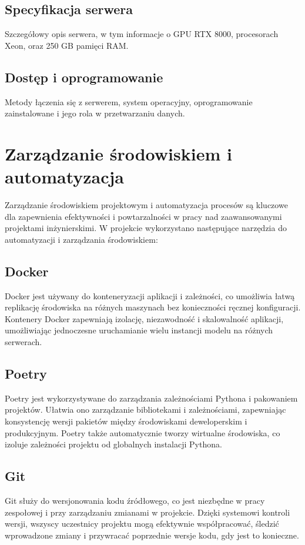\documentclass[12pt,twoside]{article}
\begin{document}
\subsection{Specyfikacja serwera}
Szczegółowy opis serwera, w tym informacje o GPU RTX 8000, procesorach Xeon, oraz 250 GB pamięci RAM.

\subsection{Dostęp i oprogramowanie}
Metody łączenia się z serwerem, system operacyjny, oprogramowanie zainstalowane i jego rola w przetwarzaniu danych.

\section{Zarządzanie środowiskiem i automatyzacja}
Zarządzanie środowiskiem projektowym i automatyzacja procesów są kluczowe dla zapewnienia efektywności i powtarzalności w pracy nad zaawansowanymi projektami inżynierskimi. W projekcie wykorzystano następujące narzędzia do automatyzacji i zarządzania środowiskiem:

\subsection{Docker}
Docker jest używany do konteneryzacji aplikacji i zależności, co umożliwia łatwą replikację środowiska na różnych maszynach bez konieczności ręcznej konfiguracji. Kontenery Docker zapewniają izolację, niezawodność i skalowalność aplikacji, umożliwiając jednoczesne uruchamianie wielu instancji modelu na różnych serwerach.

\subsection{Poetry}
Poetry jest wykorzystywane do zarządzania zależnościami Pythona i pakowaniem projektów. Ułatwia ono zarządzanie bibliotekami i zależnościami, zapewniając konsystencję wersji pakietów między środowiskami deweloperskim i produkcyjnym. Poetry także automatycznie tworzy wirtualne środowiska, co izoluje zależności projektu od globalnych instalacji Pythona.

\subsection{Git}
Git służy do wersjonowania kodu źródłowego, co jest niezbędne w pracy zespołowej i przy zarządzaniu zmianami w projekcie. Dzięki systemowi kontroli wersji, wszyscy uczestnicy projektu mogą efektywnie współpracować, śledzić wprowadzone zmiany i przywracać poprzednie wersje kodu, gdy jest to konieczne.
\end{document}
